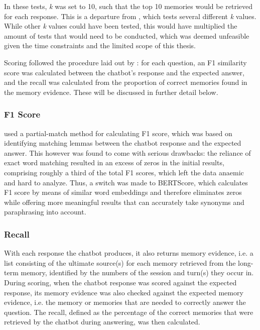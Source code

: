 In these tests, \textit{k} was set to 10, such that the top 10 memories would be retrieved for each response. This is a departure from \cite{Maharana2024}, which tests several different \textit{k} values. While other \textit{k} values could have been tested, this would have multiplied the amount of tests that would need to be conducted, which was deemed unfeasible given the time constraints and the limited scope of this thesis.

Scoring followed the procedure laid out by \cite{Maharana2024}: for each question, an F1 similarity score was calculated between the chatbot's response and the expected answer, and the recall was calculated from the proportion of correct memories found in the memory evidence. These will be discussed in further detail below.


\subsubsection{F1 Score}

\cite{Maharana2024} used a partial-match method for calculating F1 score, which was based on identifying matching lemmas between the chatbot response and the expected answer. This however was found to come with serious drawbacks: the reliance of exact word matching resulted in an excess of zeros in the initial results, comprising roughly a third of the total F1 scores, which left the data anaemic and hard to analyze. Thus, a switch was made to BERTScore, which calculates F1 score by means of similar word embeddings and therefore eliminates zeros while offering more meaningful results that can accurately take synonyms and paraphrasing into account. 


\subsubsection{Recall}

With each response the chatbot produces, it also returns memory evidence, i.e. a list consisting of the ultimate source(s) for each memory retrieved from the long-term memory, identified by the numbers of the session and turn(s) they occur in. During scoring, when the chatbot response was scored against the expected response, its memory evidence was also checked against the expected memory evidence, i.e. the memory or memories that are needed to correctly answer the question. The recall, defined as the percentage of the correct memories that were retrieved by the chatbot during answering, was then calculated.


